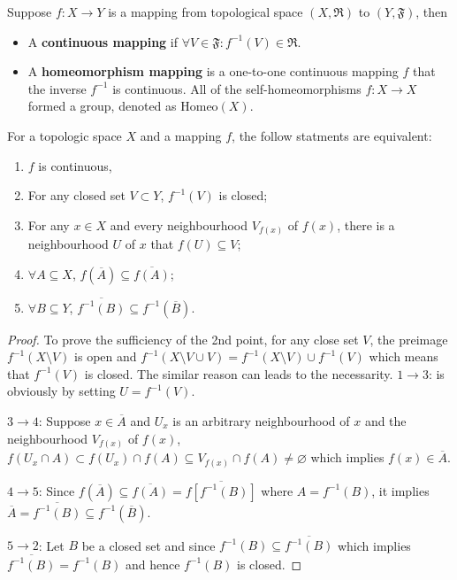 \begin{definition}
Suppose $f:X\to Y$ is a mapping from topological space $(X,\mathfrak{R})$ to $(Y,\mathfrak{F})$, then
\begin{itemize}
\item A \textbf{continuous mapping} if $\forall V\in \mathfrak{F}: f^{-1}(V)\in\mathfrak{R}$. 
\item A \textbf{homeomorphism mapping} is a one-to-one continuous mapping $f$ that the inverse $f^{-1}$ is continuous. All of the self-homeomorphisms $f:X\to X$ formed a group, denoted as $\text{Homeo}(X)$. 
\end{itemize}
\end{definition}

\begin{theorem}
For a topologic space $X$ and a mapping $f$, the follow statments are equivalent:
\begin{enumerate}
\item $f$ is continuous,
\item For any closed set $V\subset Y$, $f^{-1}(V)$ is closed;
\item For any $x\in X$ and every neighbourhood $V_{f(x)}$ of $f(x)$, there is a neighbourhood $U$ of $x$ that $f(U)\subseteq V$;
\item $\forall A\subseteq X$, $f(\overline{A})\subseteq \overline{f(A)}$;
\item $\forall B\subseteq Y$, $\overline{f^{-1}(B)}\subseteq f^{-1}(\overline{B})$.
\end{enumerate}
\end{theorem}

\begin{proof}
To prove the sufficiency of the 2nd point, for any close set $V$, the preimage $f^{-1}(X\setminus V)$ is open and $f^{-1}(X\setminus V\cup V)=f^{-1}(X\setminus V)\cup f^{-1}(V)$ which means that $f^{-1}(V)$ is closed. The similar reason can leads to the necessarity. 
$1\to 3$: is obviously by setting $U=f^{-1}(V)$.

$3\to 4$: Suppose $x\in \overline{A}$ and $U_x$ is an arbitrary neighbourhood of $x$ and the neighbourhood $V_{f(x)}$ of $f(x)$, $f(U_x\cap A)\subset f(U_x)\cap f(A)\subseteq V_{f(x)}\cap f(A)\ne\varnothing$ which implies $f(x)\in \overline{A}$.

$4\to 5$: Since $f(\overline{A})\subseteq \overline{f(A)}=\overline{f[f^{-1}(B)]}$ where $A=f^{-1}(B)$, it implies $\overline {A}=\overline{f^{-1}(B)}\subseteq f^{-1}(\overline{B})$.

$5\to 2$: Let $B$ be a closed set and since $f^{-1}(B)\subseteq \overline{f^{-1}(B)}$ which implies $\overline{f^{-1}(B)}=f^{-1}(B)$ and hence $f^{-1}(B)$ is closed.
\end{proof}


